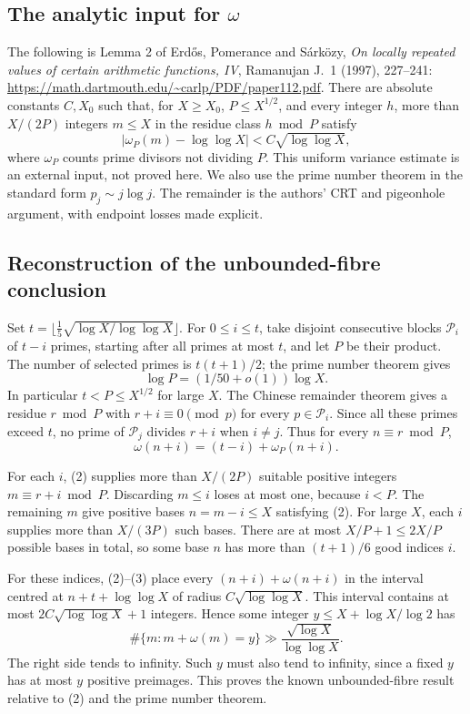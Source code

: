 \subsection*{The analytic input for $\omega$}
The following is Lemma 2 of Erd\H{o}s, Pomerance and S\'ark\"ozy, \emph{On locally repeated values of certain arithmetic functions, IV}, Ramanujan J.\ 1 (1997), 227--241:
\url{https://math.dartmouth.edu/~carlp/PDF/paper112.pdf}.
There are absolute constants $C,X_0$ such that, for $X\ge X_0$, $P\le X^{1/2}$, and every integer $h$, more than $X/(2P)$ integers $m\le X$ in the residue class $h\bmod P$ satisfy
\[
 |\omega_P(m)-\log\log X|<C\sqrt{\log\log X}, \tag{2}
\]
where $\omega_P$ counts prime divisors not dividing $P$. This uniform variance estimate is an external input, not proved here. We also use the prime number theorem in the standard form $p_j\sim j\log j$. The remainder is the authors' CRT and pigeonhole argument, with endpoint losses made explicit.

\subsection*{Reconstruction of the unbounded-fibre conclusion}
Set $t=\lfloor\frac15\sqrt{\log X/\log\log X}\rfloor$. For $0\le i\le t$, take disjoint consecutive blocks $\mathcal P_i$ of $t-i$ primes, starting after all primes at most $t$, and let $P$ be their product. The number of selected primes is $t(t+1)/2$; the prime number theorem gives
\[
 \log P=(1/50+o(1))\log X.
\]
In particular $t<P\le X^{1/2}$ for large $X$. The Chinese remainder theorem gives a residue $r\bmod P$ with $r+i\equiv0\pmod p$ for every $p\in\mathcal P_i$. Since all these primes exceed $t$, no prime of $\mathcal P_j$ divides $r+i$ when $i\ne j$. Thus for every $n\equiv r\bmod P$,
\[
 \omega(n+i)=(t-i)+\omega_P(n+i). \tag{3}
\]

For each $i$, (2) supplies more than $X/(2P)$ suitable positive integers $m\equiv r+i\bmod P$. Discarding $m\le i$ loses at most one, because $i<P$. The remaining $m$ give positive bases $n=m-i\le X$ satisfying (2). For large $X$, each $i$ supplies more than $X/(3P)$ such bases. There are at most $X/P+1\le2X/P$ possible bases in total, so some base $n$ has more than $(t+1)/6$ good indices $i$.

For these indices, (2)--(3) place every $(n+i)+\omega(n+i)$ in the interval centred at $n+t+\log\log X$ of radius $C\sqrt{\log\log X}$. This interval contains at most $2C\sqrt{\log\log X}+1$ integers. Hence some integer $y\le X+\log X/\log2$ has
\[
 \#\{m:m+\omega(m)=y\}
 \gg\frac{\sqrt{\log X}}{\log\log X}. \tag{4}
\]
The right side tends to infinity. Such $y$ must also tend to infinity, since a fixed $y$ has at most $y$ positive preimages. This proves the known unbounded-fibre result relative to (2) and the prime number theorem.


